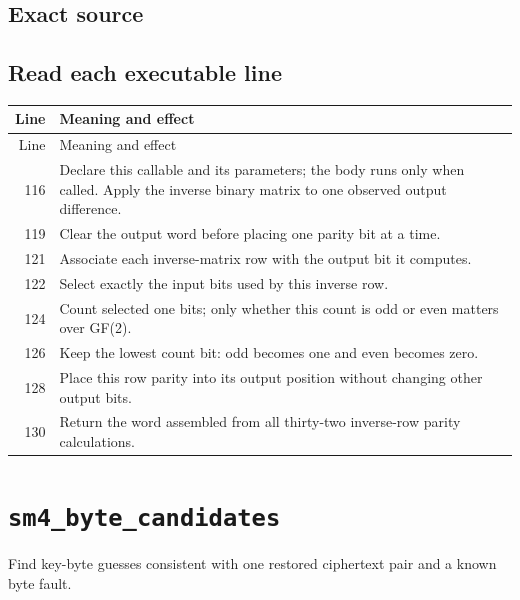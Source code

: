 \subsection*{Exact source}
\subsection*{Read each executable line}
\begingroup\small\begin{longtable}{r >{\raggedright\arraybackslash}p{138mm}}\toprule Line&Meaning and effect\\\midrule\endfirsthead\toprule Line&Meaning and effect\\\midrule\endhead
116&Declare this callable and its parameters; the body runs only when called. Apply the inverse binary matrix to one observed output difference.\\
119&Clear the output word before placing one parity bit at a time.\\
121&Associate each inverse-matrix row with the output bit it computes.\\
122&Select exactly the input bits used by this inverse row.\\
124&Count selected one bits; only whether this count is odd or even matters over GF(2).\\
126&Keep the lowest count bit: odd becomes one and even becomes zero.\\
128&Place this row parity into its output position without changing other output bits.\\
130&Return the word assembled from all thirty-two inverse-row parity calculations.\\
\bottomrule\end{longtable}\endgroup
\section{\texttt{sm4\_byte\_candidates}}
Find key-byte guesses consistent with one restored ciphertext pair and a known byte fault.
\begin{center}\end{center}
